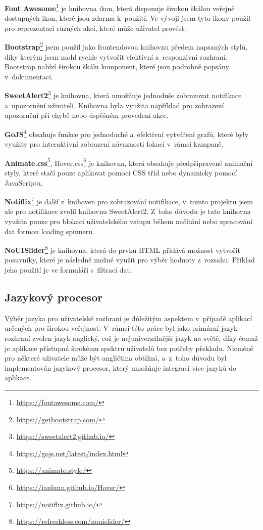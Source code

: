 \begin{description}
    \item \textbf{Font Awesome}\footnote{\href{https://fontawesome.com/}{https://fontawesome.com/}} je knihovna ikon, která disponuje širokou škálou veřejně dostupných ikon, které jsou zdarma k~použití. Ve vývoji jsem tyto ikony použil pro reprezentaci různých akcí, které může uživatel provést.
    \item \textbf{Bootstrap}\footnote{\href{https://getbootstrap.com/}{https://getbootstrap.com/}} jsem použil jako frontendovou knihovnu předem napsaných stylů, díky kterým jsem mohl rychle vytvořit efektivní a~responzivní rozhraní. Bootstrap nabízí širokou škálu komponent, které jsou podrobně popsány v~dokumentaci.
    \item \textbf{SweetAlert2}\footnote{\href{https://sweetalert2.github.io/}{https://sweetalert2.github.io/}} je knihovna, která umožňuje jednoduše zobrazovat notifikace a~upozornění uživateli. Knihovna byla využita například pro zobrazení upozornění při chybě nebo úspěšném provedení akce.
    \item \textbf{GoJS}\footnote{\href{https://gojs.net/latest/index.html}{https://gojs.net/latest/index.html}} obsahuje funkce pro jednoduché a~efektivní vytváření grafů, které byly využity pro interaktivní zobrazení návaznosti lokací v~rámci kampaně.
    \item \textbf{Animate.css}\footnote{\href{https://animate.style/}{https://animate.style/}}, Hover.css\footnote{\href{https://ianlunn.github.io/Hover/}{https://ianlunn.github.io/Hover/}} je knihovna, která obsahuje předpřipravené animační styly, které stačí pouze aplikovat pomocí CSS tříd nebo dynamicky pomocí JavaScriptu.
    \item \textbf{Notiflix}\footnote{\href{https://notiflix.github.io/}{https://notiflix.github.io/}} je další z~knihoven pro zobrazování notifikace, v~tomto projektu jsem ale pro notifikace zvolil knihovnu SweetAlert2. Z~toho důvodu je tato knihovna využita pouze pro blokaci uživatelského vstupu během načítání nebo zpracování dat formou loading spinneru.
    \item \textbf{NoUISlider}\footnote{\href{https://refreshless.com/nouislider/}{https://refreshless.com/nouislider/}} je knihovna, která do prvků HTML přidává možnost vytvořit posuvníky, které je následně možné využit pro výběr hodnoty z~rozsahu. Příklad jeho použití je ve formuláři s~filtrací dat.
\end{description}

\subsection{Jazykový procesor}
\label{subsec:implementation-technologies-compiler}
Výběr jazyka pro uživatelské rozhraní je důležitým aspektem v~případě aplikací určených pro širokou veřejnost. V~rámci této práce byl jako primární jazyk rozhraní zvolen jazyk anglický, což je nejuniverzálnější jazyk na světě, díky čemuž je aplikace přístupná širokému spektru uživatelů bez potřeby překladu. Nicméně pro některé uživatele může být angličtina obtížná, a~z~toho důvodu byl implementován jazykový procesor, který umožňuje integraci více jazyků do aplikace.

